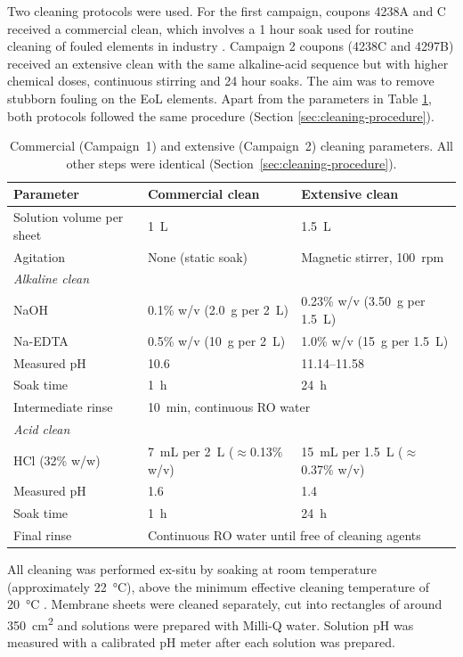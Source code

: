 Two cleaning protocols were used. For the first campaign, coupons 4238A and C received a commercial clean, which involves a 1 hour soak used for routine cleaning of fouled elements in industry \citep{DuPont2026, Lenntech2011}. Campaign 2 coupons (4238C and 4297B) received an extensive clean with the same alkaline-acid sequence but with higher chemical doses, continuous stirring and 24 hour soaks. The aim was to remove stubborn fouling on the EoL elements. Apart from the parameters in Table \ref{tab:cleaning-protocols}, both protocols followed the same procedure (Section \ref{sec:cleaning-procedure}).

\begin{table}[htbp]
  \centering
  \caption{Commercial (Campaign~1) and extensive (Campaign~2) cleaning parameters. All other steps were identical (Section~\ref{sec:cleaning-procedure}).}
  \label{tab:cleaning-protocols}
  \begin{tabular}{lll}
    \toprule
    Parameter & Commercial clean & Extensive clean \\
    \midrule
    Solution volume per sheet & 1~L & 1.5~L \\
    Agitation & None (static soak) & Magnetic stirrer, 100~rpm \\
    \midrule
    \multicolumn{3}{l}{\textit{Alkaline clean}} \\
    NaOH & 0.1\% w/v (2.0~g per 2~L) & 0.23\% w/v (3.50~g per 1.5~L) \\
    Na-EDTA & 0.5\% w/v (10~g per 2~L) & 1.0\% w/v (15~g per 1.5~L) \\
    Measured pH & 10.6 & 11.14--11.58 \\
    Soak time & 1~h & 24~h \\
    \midrule
    Intermediate rinse & \multicolumn{2}{l}{10~min, continuous RO water} \\
    \midrule
    \multicolumn{3}{l}{\textit{Acid clean}} \\
    HCl (32\% w/w) & 7~mL per 2~L ($\approx$0.13\% w/v) & 15~mL per 1.5~L ($\approx$0.37\% w/v) \\
    Measured pH & 1.6 & 1.4 \\
    Soak time & 1~h & 24~h \\
    \midrule
    Final rinse & \multicolumn{2}{l}{Continuous RO water until free of cleaning agents} \\
    \bottomrule
  \end{tabular}
\end{table}

All cleaning was performed ex-situ by soaking at room temperature (approximately \SI{22}{\celsius}), above the minimum effective cleaning temperature of \SI{20}{\celsius} \citep{Lenntech2011}. Membrane sheets were cleaned separately, cut into rectangles of around \qty{350}{\square\centi\metre} and solutions were prepared with Milli-Q water. Solution pH was measured with a calibrated pH meter after each solution was prepared. 

